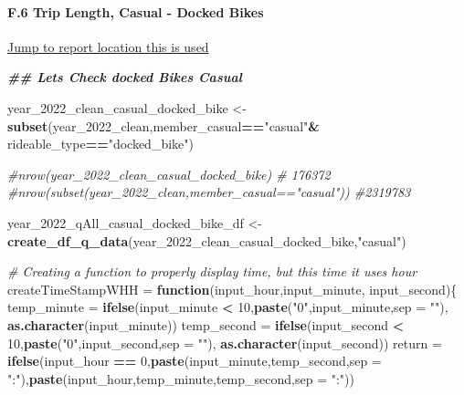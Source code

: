 \documentclass[
]{article}
\newenvironment{Shaded}{\begin{snugshade}}{\end{snugshade}}
\newcommand{\AttributeTok}[1]{\textcolor[rgb]{0.13,0.29,0.53}{#1}}
\newcommand{\CommentTok}[1]{\textcolor[rgb]{0.56,0.35,0.01}{\textit{#1}}}
\newcommand{\ControlFlowTok}[1]{\textcolor[rgb]{0.13,0.29,0.53}{\textbf{#1}}}
\newcommand{\DecValTok}[1]{\textcolor[rgb]{0.00,0.00,0.81}{#1}}
\newcommand{\DocumentationTok}[1]{\textcolor[rgb]{0.56,0.35,0.01}{\textbf{\textit{#1}}}}
\newcommand{\FunctionTok}[1]{\textcolor[rgb]{0.13,0.29,0.53}{\textbf{#1}}}
\newcommand{\NormalTok}[1]{#1}
\newcommand{\OtherTok}[1]{\textcolor[rgb]{0.56,0.35,0.01}{#1}}
\newcommand{\SpecialCharTok}[1]{\textcolor[rgb]{0.81,0.36,0.00}{\textbf{#1}}}
\newcommand{\StringTok}[1]{\textcolor[rgb]{0.31,0.60,0.02}{#1}}
\begin{document}
\hypertarget{f.6-trip-length-casual---docked-bikes}{%
\paragraph{F.6 Trip Length, Casual - Docked
Bikes}\label{f.6-trip-length-casual---docked-bikes}}

\protect\hyperlink{Ref6}{Jump to report location this is used}

\begin{Shaded}
\begin{Highlighting}[]
\DocumentationTok{\#\# Let\textquotesingle{}s Check docked Bikes Casual}

\NormalTok{year\_2022\_clean\_casual\_docked\_bike }\OtherTok{\textless{}{-}} \FunctionTok{subset}\NormalTok{(year\_2022\_clean,member\_casual}\SpecialCharTok{==}\StringTok{"casual"}\SpecialCharTok{\&}\NormalTok{ rideable\_type}\SpecialCharTok{==}\StringTok{"docked\_bike"}\NormalTok{)}

\CommentTok{\#nrow(year\_2022\_clean\_casual\_docked\_bike) \# 176372 }
\CommentTok{\#nrow(subset(year\_2022\_clean,member\_casual=="casual")) \#2319783}

\NormalTok{year\_2022\_qAll\_casual\_docked\_bike\_df }\OtherTok{\textless{}{-}} \FunctionTok{create\_df\_q\_data}\NormalTok{(year\_2022\_clean\_casual\_docked\_bike,}\StringTok{"casual"}\NormalTok{)}

\CommentTok{\# Creating a function to properly display time, but this time it uses hour}
\NormalTok{createTimeStampWHH }\OtherTok{=} \ControlFlowTok{function}\NormalTok{(input\_hour,input\_minute, input\_second)\{}
\NormalTok{  temp\_minute }\OtherTok{=} \FunctionTok{ifelse}\NormalTok{(input\_minute }\SpecialCharTok{\textless{}} \DecValTok{10}\NormalTok{,}\FunctionTok{paste}\NormalTok{(}\StringTok{"0"}\NormalTok{,input\_minute,}\AttributeTok{sep =} \StringTok{""}\NormalTok{),}
                       \FunctionTok{as.character}\NormalTok{(input\_minute))}
\NormalTok{  temp\_second }\OtherTok{=} \FunctionTok{ifelse}\NormalTok{(input\_second }\SpecialCharTok{\textless{}} \DecValTok{10}\NormalTok{,}\FunctionTok{paste}\NormalTok{(}\StringTok{"0"}\NormalTok{,input\_second,}\AttributeTok{sep =} \StringTok{""}\NormalTok{),}
                       \FunctionTok{as.character}\NormalTok{(input\_second))}
\NormalTok{  return }\OtherTok{=} \FunctionTok{ifelse}\NormalTok{(input\_hour }\SpecialCharTok{==} \DecValTok{0}\NormalTok{,}\FunctionTok{paste}\NormalTok{(input\_minute,temp\_second,}\AttributeTok{sep =} \StringTok{":"}\NormalTok{),}\FunctionTok{paste}\NormalTok{(input\_hour,temp\_minute,temp\_second,}\AttributeTok{sep =} \StringTok{":"}\NormalTok{))}
    

\end{Highlighting}
\end{Shaded}
\end{document}
